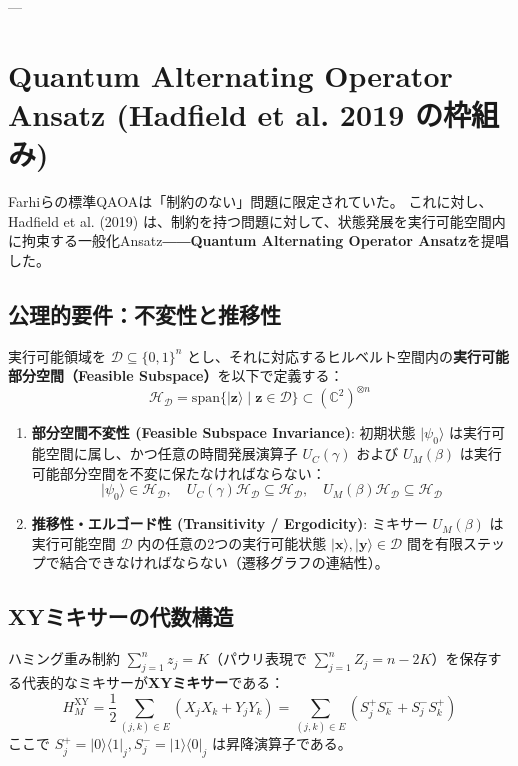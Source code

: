 \documentclass[11pt,a4paper]{ltjsarticle}
\theoremstyle{definition}
\theoremstyle{plain}
\theoremstyle{remark}
\newcommand{\ket}[1]{|#1\rangle}
\newcommand{\bra}[1]{\langle#1|}
\begin{document}
---

\section{Quantum Alternating Operator Ansatz (Hadfield et al. 2019 の枠組み)}

Farhiらの標準QAOAは「制約のない」問題に限定されていた。
これに対し、Hadfield et al. (2019) \cite{hadfield2019from} は、制約を持つ問題に対して、状態発展を実行可能空間内に拘束する一般化Ansatz――\textbf{Quantum Alternating Operator Ansatz}を提唱した。

\subsection{公理的要件：不変性と推移性}
実行可能領域を $\mathcal{D} \subseteq \{0, 1\}^n$ とし、それに対応するヒルベルト空間内の\textbf{実行可能部分空間（Feasible Subspace）}を以下で定義する：
\begin{equation}
\mathcal{H}_{\mathcal{D}} = \text{span}\{\ket{\bm{z}} \mid \bm{z} \in \mathcal{D}\} \subset (\mathbb{C}^2)^{\otimes n}
\end{equation}

\begin{paperbox}
\begin{enumerate}
    \item \textbf{部分空間不変性 (Feasible Subspace Invariance)}:
    初期状態 $\ket{\psi_0}$ は実行可能空間に属し、かつ任意の時間発展演算子 $U_C(\gamma)$ および $U_M(\beta)$ は実行可能部分空間を不変に保たなければならない：
    \begin{equation}
    \ket{\psi_0} \in \mathcal{H}_{\mathcal{D}}, \quad U_C(\gamma) \mathcal{H}_{\mathcal{D}} \subseteq \mathcal{H}_{\mathcal{D}}, \quad U_M(\beta) \mathcal{H}_{\mathcal{D}} \subseteq \mathcal{H}_{\mathcal{D}}
    \end{equation}
    \item \textbf{推移性・エルゴード性 (Transitivity / Ergodicity)}:
    ミキサー $U_M(\beta)$ は実行可能空間 $\mathcal{D}$ 内の任意の2つの実行可能状態 $\ket{\bm{x}}, \ket{\bm{y}} \in \mathcal{D}$ 間を有限ステップで結合できなければならない（遷移グラフの連結性）。
\end{enumerate}
\end{paperbox}

\subsection{XYミキサーの代数構造}
ハミング重み制約 $\sum_{j=1}^n z_j = K$（パウリ表現で $\sum_{j=1}^n Z_j = n - 2K$）を保存する代表的なミキサーが\textbf{XYミキサー}である：
\begin{equation}
H_M^{\text{XY}} = \frac{1}{2} \sum_{(j, k) \in E} (X_j X_k + Y_j Y_k) = \sum_{(j, k) \in E} (S_j^+ S_k^- + S_j^- S_k^+)
\end{equation}
ここで $S_j^+ = \ket{0}\bra{1}_j, S_j^- = \ket{1}\bra{0}_j$ は昇降演算子である。
\end{document}
